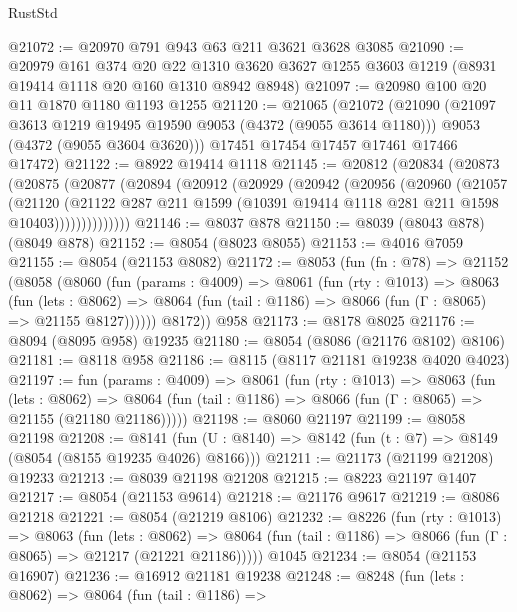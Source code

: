 \begin{lexlean}{RustStd}
\begin{coremodule}
@21072 := @20970 @791 @943 @63 @211 @3621 @3628 @3085
@21090 := @20979
    @161
    @374
    @20
    @22
    @1310
    @3620
    @3627
    @1255
    @3603
    @1219
    (@8931 @19414 @1118 @20 @160 @1310 @8942 @8948)
@21097 := @20980 @100 @20 @11 @1870 @1180 @1193 @1255
@21120 := @21065
    (@21072
      (@21090
        (@21097 @3613 @1219 @19495 @19590 @9053 (@4372 (@9055 @3614 @1180)))
        @9053
        (@4372 (@9055 @3604 @3620)))
      @17451
      @17454
      @17457
      @17461
      @17466
      @17472)
@21122 := @8922 @19414 @1118
@21145 := @20812
    (@20834
      (@20873
        (@20875
          (@20877
            (@20894
              (@20912
                (@20929
                  (@20942
                    (@20956
                      (@20960
                        (@21057
                          (@21120
                            (@21122
                              @287
                              @211
                              @1599
                              (@10391 @19414 @1118 @281 @211 @1598 @10403))))))))))))))
@21146 := @8037 @878
@21150 := @8039 (@8043 @878) (@8049 @878)
@21152 := @8054 (@8023 @8055)
@21153 := @4016 @7059
@21155 := @8054 (@21153 @8082)
@21172 := @8053
    (fun (fn : @78) =>
    @21152
      (@8058
        (@8060
          (fun (params : @4009) =>
          @8061
            (fun (rty : @1013) =>
            @8063
              (fun (lets : @8062) =>
              @8064 (fun (tail : @1186) => @8066 (fun (Γ : @8065) => @21155 @8127))))))
        @8172))
    @958
@21173 := @8178 @8025
@21176 := @8094 (@8095 @958) @19235
@21180 := @8054 (@8086 (@21176 @8102) @8106)
@21181 := @8118 @958
@21186 := @8115 (@8117 @21181 @19238 @4020 @4023)
@21197 := fun (params : @4009) =>
  @8061
    (fun (rty : @1013) =>
    @8063
      (fun (lets : @8062) =>
      @8064 (fun (tail : @1186) => @8066 (fun (Γ : @8065) => @21155 (@21180 @21186)))))
@21198 := @8060 @21197
@21199 := @8058 @21198
@21208 := @8141
    (fun (U : @8140) => @8142 (fun (t : @7) => @8149 (@8054 (@8155 @19235 @4026) @8166)))
@21211 := @21173 (@21199 @21208) @19233
@21213 := @8039 @21198 @21208
@21215 := @8223 @21197 @1407
@21217 := @8054 (@21153 @9614)
@21218 := @21176 @9617
@21219 := @8086 @21218
@21221 := @8054 (@21219 @8106)
@21232 := @8226
    (fun (rty : @1013) =>
    @8063
      (fun (lets : @8062) =>
      @8064 (fun (tail : @1186) => @8066 (fun (Γ : @8065) => @21217 (@21221 @21186)))))
    @1045
@21234 := @8054 (@21153 @16907)
@21236 := @16912 @21181 @19238
@21248 := @8248
    (fun (lets : @8062) =>
    @8064
      (fun (tail : @1186) =>

\end{coremodule}
\end{lexlean}
